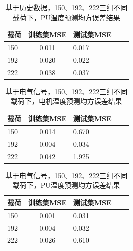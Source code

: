   \begin{table}
    \centering
    \caption{基于历史数据，150、192、222三组不同载荷下，PU温度预测均方误差结果}
    \begin{tabular}{lclcl}
      \toprule
      载荷       & 训练集MSE & 测试集MSE                                    \\
      \midrule
      150    & 0.011 & 0.017                                \\
      192 & 0.020 & 0.022                                     \\
      222 & 0.038 & 0.037                 \\
      \bottomrule
    \end{tabular}
    \label{tab:regression PU results}
  \end{table}
  
  \begin{table}
    \centering
    \caption{基于电气信号，150、192、222三组不同载荷下，电机温度预测均方误差结果}
    \begin{tabular}{lclcl}
      \toprule
      载荷       & 训练集MSE & 测试集MSE                                   \\
      \midrule
      150    & 0.014 & 0.670                                \\
      192 & 0.004 & 0.034                                    \\
      222 & 0.042 & 1.925                 \\
      \bottomrule
    \end{tabular}
    \label{tab:prediction motor results}
  \end{table}

  \begin{table}
    \centering
    \caption{基于电气信号，150、192、222三组不同载荷下，PU温度预测均方误差结果}
    \begin{tabular}{lclcl}
      \toprule
      载荷       & 训练集MSE & 测试集MSE                                    \\
      \midrule
      150    & 0.001 & 0.031                                \\
      192 & 0.004 & 0.032                                     \\
      222 & 0.026 & 0.610              \\
      \bottomrule
    \end{tabular}
    \label{tab:prediction PU results}
  \end{table}
  
